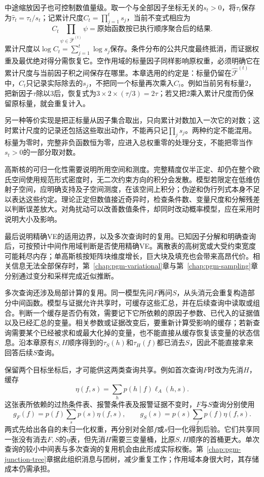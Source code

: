 中途缩放因子也可控制数值量级。取一个与全部因子坐标无关的$s_t>0$，将$\tau_t$保存为$\widehat{\tau}_t=\tau_t/s_t$；记累计尺度$C_t=\prod_{j=1}^t s_j$，当前不变式相应为
\[
  C_t\prod_{\psi\in\widehat{\mathcal{F}}^{(t)}}\psi
  =\text{原始函数按已执行顺序聚合后的结果}.
\]
累计尺度以$\log C_t=\sum_{j=1}^t\log s_j$保存。条件分布的公共尺度最终抵消，而证据权重及最优绝对得分需恢复它。空作用域的标量因子同样影响原权重，必须明确它在累计尺度与当前因子积之间保存在哪里。本章选用的约定是：标量仍留在$\widehat{\mathcal{F}}^{(t)}$中，$C_t$只记录实际除去的$s_j$，不把同一个标量再次乘入$C_t$。例如当前另有标量$2$，把新因子$\tau$除以$3$后，恢复式为$3\times2\times(\tau/3)=2\tau$；若又把$2$乘入累计尺度而仍保留原标量，就会重复计入。

另一种等价实现是把正标量从因子集合取出，只向累计对数加入一次它的对数；这时累计尺度的记录还包括这些取出动作，不能再只记$\prod_j s_j$。两种约定不能混用。标量为零时，完整非负函数恒为零，应进入总权重零的处理分支，不能把零当作$s_t>0$的一部分取对数。

高斯核的可归一化性需要说明所用空间和测度。完整精度仅半正定、却仍在整个欧氏空间使用规范形式密度时，无二次约束方向的积分会发散。模型若限定在低维仿射子空间，应明确支持及子空间测度，在该空间上积分；伪逆和伪行列式本身不足以表达这些约定。理论正定但数值接近奇异时，检查条件数、变量尺度和分解残差以判断误差放大。对角扰动可以改善数值条件，却同时改动概率模型，应在采用时说明大小及影响。

最后说明精确VE的适用边界，以及多次查询时的复用。已知因子分解和明确查询后，可按预计中间作用域判断是否使用精确VE。离散表的高树宽或大受约束宽度可能耗尽内存；单高斯核按矩阵块维度增长，巨大块及填充也会带来高昂代价。相关信息无法全部保存时，第~\ref{chap:pgm-variational}章与第~\ref{chap:pgm-sampling}章分别通过变分和采样完成近似推断。

多次查询还涉及局部计算的复用。同一模型先问$F$再问$S$，从头消元会重复构造部分中间函数。模型与证据允许共享时，可缓存这些汇总，并在后续查询中读取或组合。判断一个缓存是否仍有效，需要记下它所依赖的原因子参数、已代入的证据值以及已经汇总的变量。相关参数或证据改变后，要重新计算受影响的缓存；若新查询需要某个已经被求和或最大化掉的变量，也不能直接从缓存恢复该变量的状态信息。沿本章原有$S,H$顺序得到的$\tau_S(h)$和$\tau_H(f)$都已消去$S$，因此不能直接拿来回答后续$S$查询。

保留两个目标坐标后，才可能供这两类查询共享。例如首次查询$F$时改为先消$H$，缓存
\[
  \eta(f,s)=\sum_h p(h\mid f)\ell_A(h,s).
\]
这张表所依赖的过热条件表、报警条件表及报警证据不变时，$F$与$S$查询分别使用
\[
  g_F(f)=p(f)\sum_s p(s)\eta(f,s),
  \qquad
  g_S(s)=p(s)\sum_f p(f)\eta(f,s).
\]
两式先给出各自的未归一化权重，再分别对全部$f$或$s$归一化得到后验。它们共享同一张没有消去$F,S$的$\eta$表，但先消$H$需要三变量桶，比原$S,H$顺序的首桶更大。单次查询的较小中间表与多次查询的复用机会由此形成实际权衡。第~\ref{chap:pgm-junction-tree}章据此组织消息与团树，减少重复工作；作用域本身很大时，其存储成本仍需承担。

